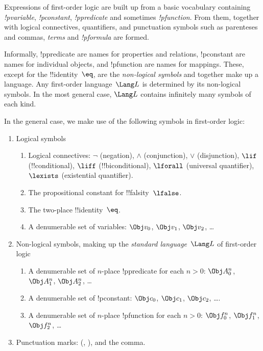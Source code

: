 \documentclass[../../include/open-logic-section]{subfiles}
\begin{document}


\begin{wordy}
Expressions of first-order logic are built up from a basic vocabulary
containing \emph{!p{variable}}, \emph{!p{constant}},
\emph{!p{predicate}} and sometimes \emph{!p{function}}.
  From them, together with logical connectives, quantifiers, and
  punctuation symbols such as parenteses and commas, \emph{terms} and
  \emph{!p{formula}} are formed.

Informally, !p{predicate} are names for properties and relations,
!p{constant} are names for individual objects, and !p{function} are names
for mappings.  These, except for the !!{identity}~$\eq$, are the
\emph{non-logical symbols} and together make up a language.  Any
first-order language~$\Lang L$ is determined by its non-logical
symbols.  In the most general case, $\Lang L$ contains infinitely
many symbols of each kind.
\end{wordy}

In the general case, we make use of the following symbols in
first-order logic:

\begin{enumerate}
\item Logical symbols
\begin{enumerate}
\item Logical connectives: $\lnot$ (negation), $\land$ (conjunction),
  $\lor$ (disjunction), $\lif$ (!!{conditional}), $\liff$ (!!{biconditional}),
  $\lforall$ (universal quantifier), $\lexists$ (existential
  quantifier).
\item The propositional constant for !!{falsity}~$\lfalse$.
\item The two-place !!{identity}~$\eq$.
\item A denumerable set of variables: $\Obj v_0$, $\Obj v_1$, $\Obj
  v_2$, \dots
\end{enumerate}
\item Non-logical symbols, making up the \emph{standard
  language}~$\Lang L$ of first-order logic
\begin{enumerate}
\item A denumerable set of $n$-place !p{predicate} for each $n>0$: $\Obj
  A^n_0$, $\Obj A^n_1$, $\Obj A^n_2$, \dots
\item A denumerable set of !p{constant}: $\Obj c_0$, $\Obj c_1$, $\Obj
  c_2$, \dots.
\item A denumerable set of $n$-place !p{function} for each $n>0$:
  $\Obj f^n_0$, $\Obj f^n_1$, $\Obj f^n_2$, \dots
\end{enumerate}
\item Punctuation marks: (, ), and the comma.
\end{enumerate}
\end{document}
